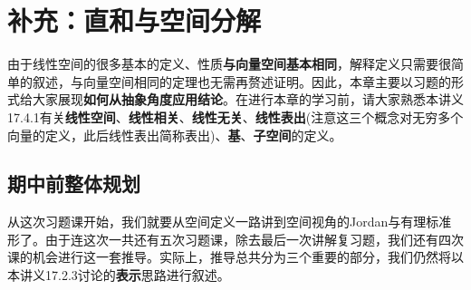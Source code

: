 \documentclass[a4paper,UTF8,fontset=windows,AutoFakeBold]{ctexart}
\begin{document}
\section{补充：直和与空间分解}
由于线性空间的很多基本的定义、性质\textbf{与向量空间基本相同}，解释定义只需要很简单的叙述，与向量空间相同的定理也无需再赘述证明。因此，本章主要以习题的形式给大家展现\textbf{如何从抽象角度应用结论}。在进行本章的学习前，请大家熟悉本讲义17.4.1有关\textbf{线性空间}、\textbf{线性相关}、\textbf{线性无关}、\textbf{线性表出}(注意这三个概念对无穷多个向量的定义，此后线性表出简称表出)、\textbf{基}、\textbf{子空间}的定义。

\subsection{期中前整体规划}
从这次习题课开始，我们就要从空间定义一路讲到空间视角的Jordan与有理标准形了。由于连这次一共还有五次习题课，除去最后一次讲解复习题，我们还有四次课的机会进行这一套推导。实际上，推导总共分为三个重要的部分，我们仍然将以本讲义17.2.3讨论的\textbf{表示}思路进行叙述。
\end{document}
